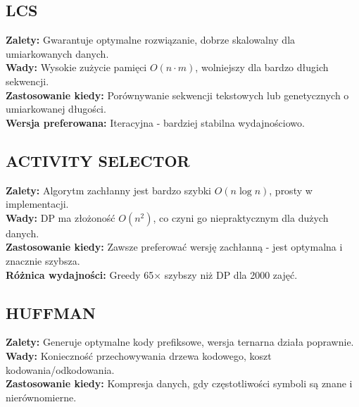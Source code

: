 \documentclass[11pt,a4paper]{article}
\begin{document}
\subsection*{LCS}
\textbf{Zalety:} Gwarantuje optymalne rozwiązanie, dobrze skalowalny dla umiarkowanych danych.\\
\textbf{Wady:} Wysokie zużycie pamięci $O(n \cdot m)$, wolniejszy dla bardzo długich sekwencji.\\
\textbf{Zastosowanie kiedy:} Porównywanie sekwencji tekstowych lub genetycznych o umiarkowanej długości.\\
\textbf{Wersja preferowana:} Iteracyjna - bardziej stabilna wydajnościowo.

\subsection*{ACTIVITY SELECTOR}
\textbf{Zalety:} Algorytm zachłanny jest bardzo szybki $O(n \log n)$, prosty w implementacji.\\
\textbf{Wady:} DP ma złożoność $O(n^2)$, co czyni go niepraktycznym dla dużych danych.\\
\textbf{Zastosowanie kiedy:} Zawsze preferować wersję zachłanną - jest optymalna i znacznie szybsza.\\
\textbf{Różnica wydajności:} Greedy 65× szybszy niż DP dla 2000 zajęć.

\subsection*{HUFFMAN}
\textbf{Zalety:} Generuje optymalne kody prefiksowe, wersja ternarna działa poprawnie.\\
\textbf{Wady:} Konieczność przechowywania drzewa kodowego, koszt kodowania/odkodowania.\\
\textbf{Zastosowanie kiedy:} Kompresja danych, gdy częstotliwości symboli są znane i nierównomierne.
\end{document}

